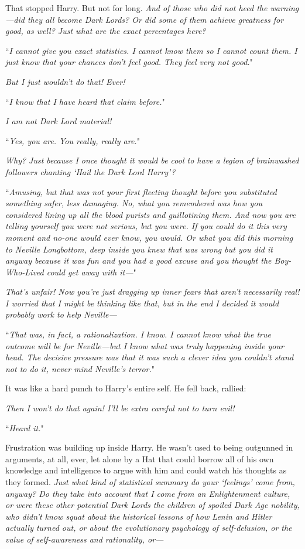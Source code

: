 That stopped Harry. But not for long. \emph{And of those who did \emph{not} heed the warning—did they \emph{all} become Dark Lords? Or did some of them achieve greatness for good, as well? Just what are the exact percentages here?}

``\emph{I cannot give you exact statistics. I cannot know them so I cannot count them. I just know that your chances don't feel good. They feel \emph{very} not good.}"

\emph{But I just wouldn't do that! Ever!}

``\emph{I know that I have heard that claim before.}"

\emph{I am not Dark Lord material!}

``\emph{Yes, you are. You really, \emph{really} are.}"

\emph{Why? Just because I once thought it would be cool to have a legion of brainwashed followers chanting `Hail the Dark Lord Harry'?}

``\emph{Amusing, but that was not your first fleeting thought before you substituted something safer, less damaging. No, what you remembered was how you considered lining up all the blood purists and guillotining them. And now you are telling yourself you were not serious, but you were. If you could do it this very moment and no-one would ever know, you would. Or what you did this morning to Neville Longbottom, deep inside you \emph{knew} that was wrong but you did it \emph{anyway} because it was \emph{fun} and you had a \emph{good excuse} and you thought the Boy-Who-Lived could \emph{get away} with it—}"

\emph{That's unfair! Now you're just dragging up inner fears that \emph{aren't} necessarily real! I \emph{worried} that I \emph{might} be thinking like that, but in the end I decided it would probably \emph{work} to help Neville—}

``\emph{That was, in fact, a rationalization. I know. I cannot know what the true outcome will be for Neville—but I know what was truly happening inside your head. The decisive pressure was that it was such a clever idea you couldn't stand \emph{not} to do it, never mind Neville's terror.}"

It was like a hard punch to Harry's entire self. He fell back, rallied:

\emph{Then I won't do that again! I'll be extra careful not to turn evil!}

``\emph{Heard it.}"

Frustration was building up inside Harry. He wasn't used to being outgunned in arguments, at all, ever, let alone by a Hat that could borrow all of his own knowledge and intelligence to argue with him and could watch his thoughts as they formed. \emph{Just what kind of statistical summary do your `feelings' come from, anyway? Do they take into account that I come from an Enlightenment culture, or were these other potential Dark Lords the children of spoiled Dark Age nobility, who didn't know squat about the historical lessons of how Lenin and Hitler actually turned out, or about the evolutionary psychology of self-delusion, or the value of self-awareness and rationality, or—}

